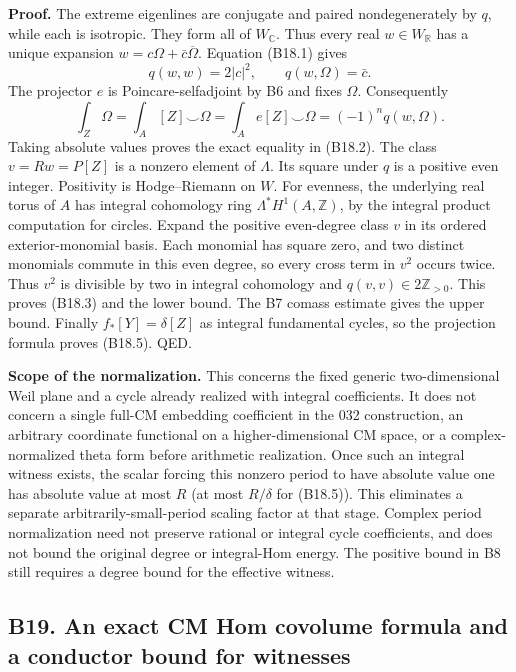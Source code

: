 \textbf{Proof.} The extreme eigenlines are conjugate and paired nondegenerately by \(q\), while each is isotropic. They form all of \(W_\mathbb C\). Thus every real \(w\in W_\mathbb R\) has a unique expansion \(w=c\Omega+\bar c\overline\Omega\). Equation (B18.1) gives \[
 q(w,w)=2|c|^2,\qquad q(w,\Omega)=\bar c.
\] The projector \(e\) is Poincare-selfadjoint by B6 and fixes \(\Omega\). Consequently \[
 \int_Z\Omega
 =\int_A[Z]\smile\Omega
 =\int_Ae[Z]\smile\Omega
 =(-1)^nq(w,\Omega).
\] Taking absolute values proves the exact equality in (B18.2). The class \(v=Rw=P[Z]\) is a nonzero element of \(\Lambda\). Its square under \(q\) is a positive even integer. Positivity is Hodge--Riemann on \(W\). For evenness, the underlying real torus of \(A\) has integral cohomology ring \(\Lambda^*H^1(A,\mathbb Z)\), by the integral product computation for circles. Expand the positive even-degree class \(v\) in its ordered exterior-monomial basis. Each monomial has square zero, and two distinct monomials commute in this even degree, so every cross term in \(v^2\) occurs twice. Thus \(v^2\) is divisible by two in integral cohomology and \(q(v,v)\in2\mathbb Z_{>0}\). This proves (B18.3) and the lower bound. The B7 comass estimate gives the upper bound. Finally \(f_*[Y]=\delta[Z]\) as integral fundamental cycles, so the projection formula proves (B18.5). QED.

\textbf{Scope of the normalization.} This concerns the fixed generic two-dimensional Weil plane and a cycle already realized with integral coefficients. It does not concern a single full-CM embedding coefficient in the 032 construction, an arbitrary coordinate functional on a higher-dimensional CM space, or a complex-normalized theta form before arithmetic realization. Once such an integral witness exists, the scalar forcing this nonzero period to have absolute value one has absolute value at most \(R\) (at most \(R/\delta\) for (B18.5)). This eliminates a separate arbitrarily-small-period scaling factor at that stage. Complex period normalization need not preserve rational or integral cycle coefficients, and does not bound the original degree or integral-Hom energy. The positive bound in B8 still requires a degree bound for the effective witness.

\subsection{B19. An exact CM Hom covolume formula and a conductor bound for witnesses}\label{b19.-an-exact-cm-hom-covolume-formula-and-a-conductor-bound-for-witnesses}

